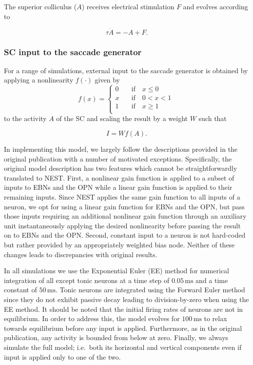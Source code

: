 \documentclass[10pt,a4paper,onecolumn]{article}
\begin{document}
The superior colliculus (\(A\)) receives electrical stimulation \(F\)
and evolves according to

\begin{equation}
\tau \dot A =-A+F \textrm{.}
\label{eq:sc}\end{equation}

\subsubsection{SC input to the saccade
generator}\label{sc-input-to-the-saccade-generator}

For a range of simulations, external input to the saccade generator is
obtained by applying a nonlinearity \(f(\cdot)\) given by
\begin{equation}
f(x) = 
\left\{
 \begin{array}{lll}
    0 \quad &\textrm{if} \quad x \leq 0 \\
    x \quad &\textrm{if} \quad 0<x<1 \\
    1 \quad &\textrm{if} \quad x \geq 1 \\
  \end{array}
\right.\
\label{eq:pw}\end{equation} to the activity \(A\) of the SC and scaling
the result by a weight \(W\) such that

\begin{equation}
I = Wf(A) \textrm{.}
\label{eq:stim}\end{equation}

In implementing this model, we largely follow the descriptions provided
in the original publication with a number of motivated exceptions.
Specifically, the original model description has two features which
cannot be straightforwardly translated to NEST. First, a nonlinear gain
function is applied to a subset of inputs to EBNs and the OPN while a
linear gain function is applied to their remaining inputs. Since NEST
applies the same gain function to all inputs of a neuron, we opt for
using a linear gain function for EBNs and the OPN, but pass those inputs
requiring an additional nonlinear gain function through an auxiliary
unit instantaneously applying the desired nonlinearity before passing
the result on to EBNs and the OPN. Second, constant input to a neuron is
not hard-coded but rather provided by an appropriately weighted bias
node. Neither of these changes leads to discrepancies with original
results.

In all simulations we use the Exponential Euler (EE) method for
numerical integration of all except tonic neurons \autocite{Hahne2017}
at a time step of \(0.05\,\mathrm{ms}\) and a time constant of
\(50\,\mathrm{ms}\). Tonic neurons are integrated using the Forward
Euler method since they do not exhibit passive decay leading to
division-by-zero when using the EE method. It should be noted that the
initial firing rates of neurons are not in equilibrium. In order to
address this, the model evolves for \(100\,\mathrm{ms}\) to relax
towards equilibrium before any input is applied. Furthermore, as in the
original publication, any activity is bounded from below at zero.
Finally, we always simulate the full model; i.e.~both its horizontal and
vertical components even if input is applied only to one of the two.
\end{document}
